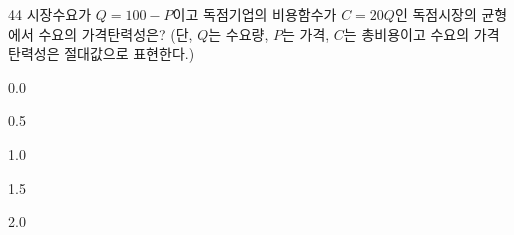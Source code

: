 \begin{question}{44}
시장수요가 $Q=100-P$이고 독점기업의 비용함수가 $C=20Q$인 독점시장의 균형에서 수요의 가격탄력성은? (단, $Q$는 수요량, $P$는 가격, $C$는 총비용이고 수요의 가격탄력성은 절대값으로 표현한다.)
\begin{choices}
  \item 0.0
  \item 0.5
  \item 1.0
  \item 1.5
  \item 2.0
\end{choices}
\end{question}
